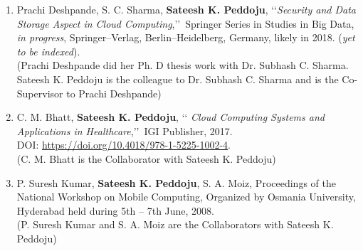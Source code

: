 
\begin{enumerate}%
	
	\item%
	Prachi Deshpande, S. C. Sharma, \textbf{Sateesh K. Peddoju},
	\lq\lq \emph{Security and Data Storage Aspect in Cloud Computing},\rq\rq\, Springer Series in
	Studies in Big Data, \textit{in progress}, Springer--Verlag, Berlin--Heidelberg,
	Germany, likely in 2018. (\emph{yet to be indexed}).
 \\(Prachi Deshpande did her Ph. D thesis work with Dr. Subhash C. Sharma. Sateesh K. Peddoju is the colleague to Dr. Subhash C. Sharma and is the Co-Supervisor to Prachi Deshpande)
		
	\item%
	C. M. Bhatt, \textbf{Sateesh K. Peddoju}, \lq\lq
	\emph{Cloud Computing Systems and Applications in Healthcare},\rq\rq\, IGI Publisher, 2017. \\DOI: \url{https://doi.org/10.4018/978-1-5225-1002-4}.
\\(C. M. Bhatt is the Collaborator with Sateesh K. Peddoju)

\item%
	P. Suresh Kumar, \textbf{Sateesh K. Peddoju}, S. A. Moiz, Proceedings of the National Workshop on Mobile Computing, Organized by Osmania University, Hyderabad held during 5th – 7th June, 2008.
\\(P. Suresh Kumar and S. A. Moiz are the Collaborators with Sateesh K. Peddoju)
\end{enumerate}
